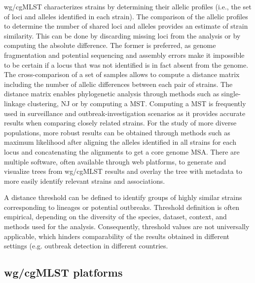 \ac{wg/cgMLST} characterizes strains by determining their allelic profiles (i.e., the set of loci and alleles identified in each strain). The comparison of the allelic profiles to determine the number of shared loci and alleles provides an estimate of strain similarity. This can be done by discarding missing loci from the analysis or by computing the absolute difference. The former is preferred, as genome fragmentation and potential sequencing and assembly errors make it impossible to be certain if a locus that was not identified is in fact absent from the genome. The cross-comparison of a set of samples allows to compute a distance matrix including the number of allelic differences between each pair of strains. The distance matrix enables phylogenetic analysis through methods such as single-linkage clustering, \ac{NJ} or by computing a \ac{MST}. Computing a \ac{MST} is frequently used in surveillance and outbreak-investigation scenarios as it provides accurate results when comparing closely related strains. For the study of more diverse populations, more robust results can be obtained through methods such as maximum likelihood after aligning the alleles identified in all strains for each locus and concatenating the alignments to get a core genome \ac{MSA}. There are multiple software, often available through web platforms, to generate and visualize trees from \ac{wg/cgMLST} results and overlay the tree with metadata to more easily identify relevant strains and associations.


A distance threshold can be defined to identify groups of highly similar strains corresponding to lineages or potential outbreaks. Threshold definition is often empirical, depending on the diversity of the species, dataset, context, and methods used for the analysis. Consequently, threshold values are not universally applicable, which hinders comparability of the results obtained in different settings (e.g. outbreak detection in different countries.

\subsection{wg/cgMLST platforms}

